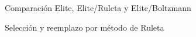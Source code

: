 \documentclass{sig-alternate}
\begin{document}
\begin{figure}[!ht]
\begin{center}
			{\label{fig:elite_boltzman2}}	
	\end{center}
	\caption{Comparación Elite, Elite/Ruleta y Elite/Boltzmann}
	\label{fig:comparisonElite}
\end{figure}

\begin{figure}[!ht]
	\begin{center}
	\end{center}
	\caption{Selección y reemplazo por método de Ruleta}
	\label{fig:rulette_rulette}
\end{figure}
\end{document}
